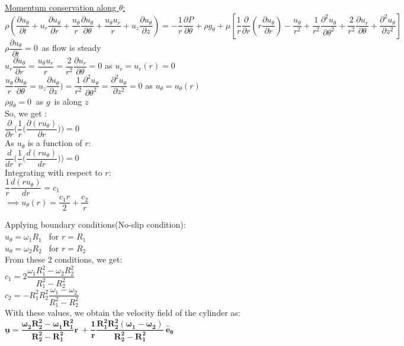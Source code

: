 \documentclass{article}
\begin{document}
\noindent \underline{Momentum conservation along $\theta$:}\\

\noindent $\rho (\dfrac{\partial u_\theta}{\partial t}+ u_r\dfrac{\partial u_\theta}{\partial r} + \dfrac{u_\theta}{r}\dfrac{\partial u_\theta}{\partial \theta} + \dfrac{u_\theta u_r}{r}+ u_z\dfrac{\partial u_\theta}{\partial z}) = -\dfrac{1}{r}\dfrac{\partial P}{\partial \theta}+ \rho g_\theta + \mu[\dfrac{1}{r}\dfrac{\partial}{\partial r}(r\dfrac{\partial u_\theta}{\partial r}) - \dfrac{u_\theta}{r^2} + \dfrac{1}{r^2}\dfrac{\partial^2 u_\theta}{\partial \theta^2} + \dfrac{2}{r^2}\dfrac{\partial u_r}{\partial \theta}+ \dfrac{\partial^2 u_\theta}{\partial z^2}]$\\

\noindent $\rho \dfrac{\partial u_{\theta}}{\partial t}=0$\ as flow is steady \\
$u_r\dfrac{\partial u_\theta}{\partial r}=\dfrac{u_\theta u_r}{r}=\dfrac{2}{r^2}\dfrac{\partial u_r}{\partial \theta}=0$ as $u_r=u_r(r)=0$\\
$\dfrac{u_\theta}{r}\dfrac{\partial u_\theta}{\partial \theta}=u_z\dfrac{\partial u_\theta}{\partial z}) = \dfrac{1}{r^2}\dfrac{\partial^2 u_\theta}{\partial \theta^2}=\dfrac{\partial^2 u_\theta}{\partial z^2}=0$ as $u_{\theta}= u_{\theta}(r)$\\
$\rho g_{\theta}=0\  $ as $g $\ is along $z$\\

\noindent So, we get :\\
$\dfrac{\partial}{\partial r}\Big (\dfrac{1}{r}\big (\dfrac{\partial (ru_\theta)}{\partial r}\big )\Big )=0$\\
As $u_\theta$ is a function of $r$:\\
$\dfrac{d}{d r}\Big (\dfrac{1}{r}\big (\dfrac{d (ru_\theta)}{d r}\big )\Big )=0$\\
Integrating with respect to $r$:\\
$\dfrac{1}{r}\dfrac{d(ru_\theta)}{dr}=c_1$\\
$\implies u_\theta(r)= \dfrac{c_1r}{2}+ \dfrac{c_2}{r}$
\bigbreak

\noindent Applying boundary conditions(No-slip condition): \\
$u_\theta=\omega_1 R_1$ \ for $r=R_1$\\
$u_\theta=\omega_2 R_2$ \ for $r=R_2$\\
From these 2 conditions, we get: \\
$c_1=2\dfrac{\omega_1 R_1^2- \omega_2R_2^2}{R_1^2-R_2^2}$\\
$c_2=-R_1^2R_2^2\dfrac{\omega_1-\omega_2}{R_1^2-R_2^2}$\\
With these values, we obtain the velocity field of the cylinder as: \\
$\mathbf{\underline{u}= \dfrac{\omega_2R_2^2- \omega_1R_1^2}{R_2^2-R_1^2}r\ + \dfrac{1}{r}\dfrac{R_1^2R_2^2(\omega_1-\omega_2)}{R_2^2-R_1^2} \ \hat{e}_\theta}$
\bigbreak
\end{document}
